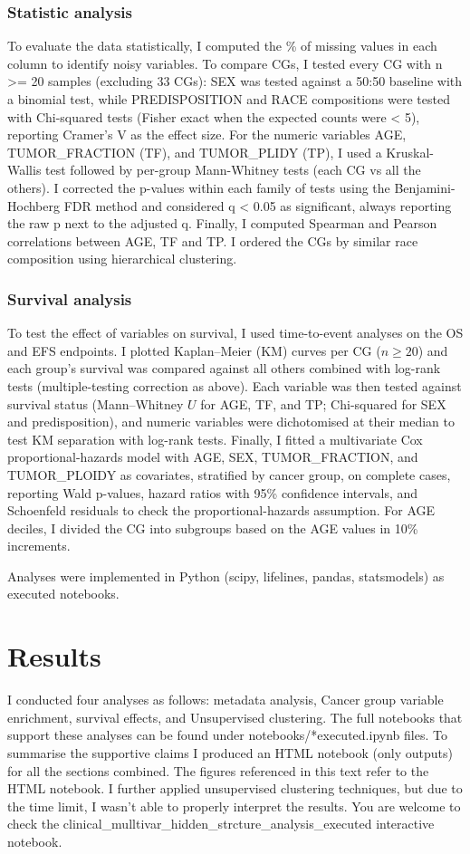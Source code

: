 \documentclass[a4paper,11pt]{article}
\begin{document}
\subsubsection{Statistic analysis}
To evaluate the data statistically, I computed the \% of missing values in each column to identify noisy variables. 
To compare CGs, I tested every CG with n >= 20 samples (excluding 33 CGs): SEX was tested against a 50:50 baseline with a 
binomial test, while PREDISPOSITION and RACE compositions were tested with Chi-squared tests 
(Fisher exact when the expected counts were < 5), reporting Cramer's V as the effect size. 
For the numeric variables AGE, TUMOR\_FRACTION (TF), and TUMOR\_PLIDY (TP), I used a Kruskal-Wallis test followed by per-group Mann-Whitney tests
(each CG vs all the others). I corrected the p-values within each family of tests using the Benjamini-Hochberg FDR
method and considered q < 0.05 as significant, always reporting the raw p next to the adjusted q. 
Finally, I computed Spearman and Pearson correlations between AGE, TF and TP. I ordered the CGs by similar
race composition using hierarchical clustering.

\subsubsection{Survival analysis}
To test the effect of variables on survival, I used time-to-event
analyses on the OS and EFS endpoints. I plotted Kaplan--Meier (KM) curves per CG ($n \geq 20$) and 
each group's survival was compared against all others combined
with log-rank tests (multiple-testing correction as above). Each variable was then tested
against survival status (Mann--Whitney $U$ for AGE, TF, and TP; Chi-squared for SEX and
predisposition), and numeric variables were dichotomised at their median to test KM
separation with log-rank tests. Finally, I fitted a multivariate Cox proportional-hazards
model with AGE, SEX, TUMOR\_FRACTION, and TUMOR\_PLOIDY as covariates, stratified by cancer
group, on complete cases, reporting Wald p-values, hazard ratios with 95\% confidence
intervals, and Schoenfeld residuals to check the proportional-hazards assumption. For AGE deciles, I divided the CG into subgroups based on the AGE values in 10\% increments.

Analyses were implemented in Python (scipy, lifelines, pandas, statsmodels) as executed notebooks.



\section{Results}
I conducted four analyses as follows: metadata analysis, Cancer group variable enrichment, survival effects, and Unsupervised clustering.
The full notebooks that support these analyses can be found under notebooks/*executed.ipynb files. To summarise the supportive claims
I produced an HTML notebook (only outputs) for all the sections combined. The figures referenced in this text refer to the HTML notebook. 
I further applied unsupervised clustering techniques, but due to the time limit, I wasn't able to properly interpret the results. You are welcome to check the clinical\_mulltivar\_hidden\_strcture\_analysis\_executed interactive notebook.
\end{document}
